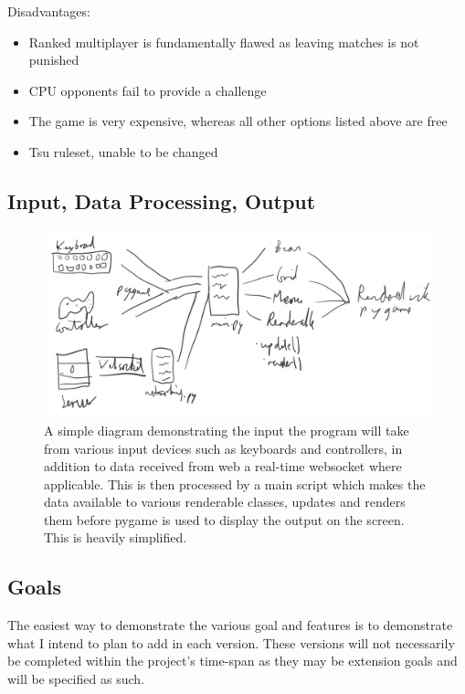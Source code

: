 \documentclass{article}
\begin{document}
Disadvantages: 

\begin{itemize}
    \renewcommand\labelitemi{--}
    \item Ranked multiplayer is fundamentally flawed as leaving matches is not punished
    \item CPU opponents fail to provide a challenge
    \item The game is very expensive, whereas all other options listed above are free
    \item Tsu ruleset, unable to be changed
\end{itemize}

\subsection{Input, Data Processing, Output}

\begin{figure}[h]
\centering
\includegraphics[width=1\textwidth]{idpo.png}
\caption{\label{fig:idpo}A simple diagram demonstrating the input the program will take from various input devices such as keyboards and controllers, in addition to data received from web a real-time websocket where applicable. This is then processed by a main script which makes the data available to various renderable classes, updates and renders them before pygame is used to display the output on the screen. This is heavily simplified.}
\end{figure}

\subsection{Goals}

The easiest way to demonstrate the various goal and features is to demonstrate what I intend to plan to add in each version. These versions will not necessarily be completed within the project's time-span as they may be extension goals and will be specified as such.
\end{document}
